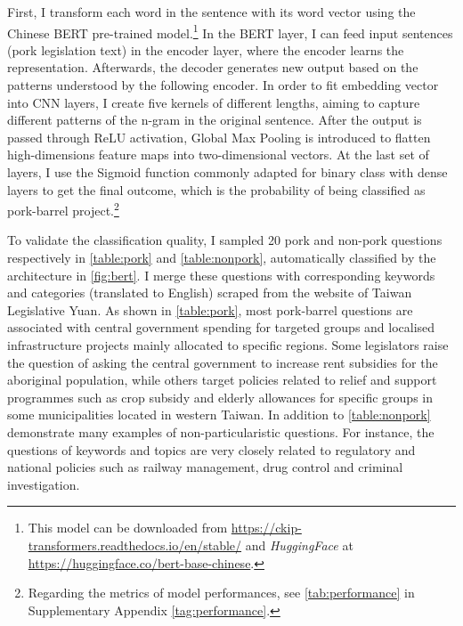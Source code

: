 First, I transform each word in the sentence with its word vector using the Chinese BERT pre-trained model.\footnote{This model can be downloaded from \href{ https://ckip-transformers.readthedocs.io/en/stable/}{ https://ckip-transformers.readthedocs.io/en/stable/} and \textit{HuggingFace} at \href{https://huggingface.co/bert-base-chinese}{https://huggingface.co/bert-base-chinese}.}  In the BERT layer, I can feed input sentences (pork legislation text) in the encoder layer, where the encoder learns the representation. Afterwards, the decoder generates new output based on the patterns understood by the following encoder. In order to fit embedding vector into CNN layers, I create five kernels of different lengths, aiming to capture different patterns of the n-gram in the original sentence. After the output is passed through ReLU activation, Global Max Pooling is introduced to flatten high-dimensions feature maps into two-dimensional vectors. At the last set of layers, I use the Sigmoid function commonly adapted for binary class with dense layers to get the final outcome, which is the probability of being classified as pork-barrel project.\footnote{Regarding the metrics of model performances, see \autoref{tab:performance} in Supplementary Appendix \ref{tag:performance}. }



To validate the classification quality, I sampled 20 pork and non-pork questions respectively in \autoref{table:pork} and \autoref{table:nonpork}, automatically classified by the architecture in \autoref{fig:bert}. I merge these questions with corresponding keywords and categories (translated to English) scraped from the website of Taiwan Legislative Yuan. As shown in \autoref{table:pork}, most pork-barrel questions are associated with central government spending for targeted groups and localised infrastructure projects mainly allocated to specific regions. Some legislators raise the question of asking the central government to increase rent subsidies for the aboriginal population, while others target policies related to relief and support programmes such as crop subsidy and elderly allowances for specific groups in some municipalities located in western Taiwan. In addition to \autoref{table:nonpork} demonstrate many examples of non-particularistic questions. For instance, the questions of keywords and topics are very closely related to regulatory and national policies such as railway management, drug control and criminal investigation. 

